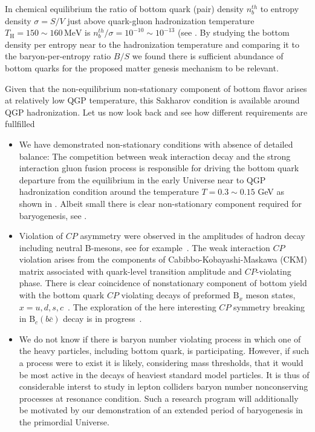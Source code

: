 In chemical equilibrium the ratio of bottom quark (pair) density $n_b^{th}$ to entropy density $\sigma=S/V$ just above quark-gluon hadronization temperature $T_\mathrm{H}=150\sim160\,\mathrm{MeV}$ is $n_b^{th}/\sigma=10^{-10}\sim10^{-13}$ (see . By studying the bottom density per entropy near to the hadronization temperature and comparing it to the baryon-per-entropy ratio $B/S$  we found there is sufficient abundance of bottom quarks for the proposed matter genesis mechanism to be relevant.

Given that the non-equilibrium non-stationary component of bottom flavor arises at relatively low QGP temperature, this Sakharov condition is available around QGP hadronization.   Let us now look back and see how different requirements are fullfilled
\begin{itemize}
\item
 We have demonstrated non-stationary conditions with absence of detailed balance: The competition between weak interaction decay and the strong interaction gluon fusion process  is responsible for driving the bottom quark departure from the equilibrium in the early Universe near to QGP hadronization condition  around the temperature $T=0.3\sim0.15$ GeV as shown in .  Albeit small there is clear non-stationary component required for baryogenesis, see .
\item Violation of $CP$ asymmetry were observed in the amplitudes of hadron decay including neutral B-mesons, see for example~\cite{LHCb:2019jta,LHCb:2020vut}. The weak interaction $CP$ violation arises from the components of Cabibbo-Kobayashi-Maskawa (CKM) matrix associated with quark-level transition amplitude and $CP$-violating phase. There is clear coincidence of nonstationary component of bottom yield with  the bottom quark $CP$  violating decays of preformed $\mathrm{B}_x$ meson states, $x=u,d,s,c$~\cite{Karsch:1987pv,Brambilla:2010vq,Aarts:2011sm,Brambilla:2017zei,Bazavov:2018wmo,Offler:2019eij}.  The exploration of the here interesting $CP$ symmetry breaking in B$_c(b\bar c)$ decay is in progress~\cite{Tully:2019ltb,HFLAV:2019otj,ParticleDataGroup:2018ovx}.  %
\item
We do not know if there is baryon number violating process in which one of the heavy particles, including bottom quark, is participating. However, if such a process were to exist it is likely, considering mass thresholds, that it would be most active in the decays of heaviest standard model particles. It is thus of considerable interst to study in lepton colliders baryon number nonconserving processes at resonance condition. Such a research program will additionally be motivated by our demonstration of an extended period of baryogenesis in the primordial Universe. 
\end{itemize}

